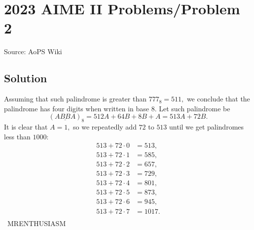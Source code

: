 \documentclass[12pt]{article}
\begin{document}
\section*{{2023 AIME II Problems/Problem 2}}
Source: AoPS Wiki

\subsection*{Solution}
Assuming that such palindrome is greater than $777_8 = 511,$ we conclude that the palindrome has four digits when written in base $8.$ Let such palindrome be \[(\underline{ABBA})_8 = 512A + 64B + 8B + A = 513A + 72B.\] It is clear that $A=1,$ so we repeatedly add $72$ to $513$ until we get palindromes less than $1000:$ \begin{align*} 513+72\cdot0 &= 513, \\ 513+72\cdot1 &= \boxed{585}, \\ 513+72\cdot2 &= 657, \\ 513+72\cdot3 &= 729, \\ 513+72\cdot4 &= 801, \\ 513+72\cdot5 &= 873, \\ 513+72\cdot6 &= 945, \\ 513+72\cdot7 &= 1017. \\ \end{align*} ~MRENTHUSIASM
\end{document}
